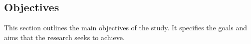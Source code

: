 \subsection{Objectives}

This section outlines the main objectives of the study. It specifies the goals and aims that the research seeks to achieve.

